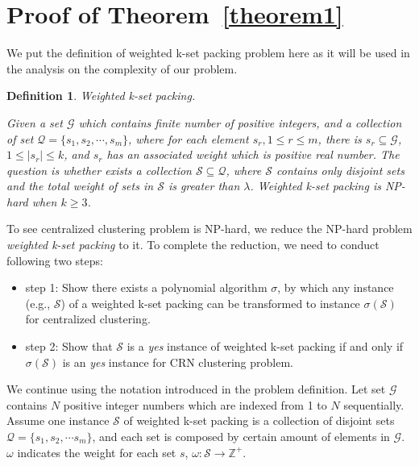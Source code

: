 \documentclass[10pt,journal,compsoc]{IEEEtran}
\makeatletter
\theoremstyle{mytheoremstyle}
\theoremstyle{mytheoremstyle}
\theoremstyle{mytheoremstyle}
\newtheorem{mydef}{Definition}%
\renewenvironment{proof}[1][\proofname]{%
      \par\pushQED{\qed}\fontfamily{ptm}\selectfont%
      \topsep6\p@\@plus6\p@\relax
      \trivlist\item[\hskip\labelsep\bfseries#1\@addpunct{.}]%
      \ignorespaces
    }{%
      \popQED\endtrivlist\@endpefalse
    }
\newcommand{\eg}{e.g., }
\makeatother
\begin{document}
\section*{Proof of Theorem~\ref{theorem1}}
\label{proof_theorem1}
\begin{proof}
We put the definition of weighted k-set packing problem here as it will be used in the analysis on the complexity of our problem.

\begin{mydef}
\label{def_kset_packing}
\textit{Weighted k-set packing.} 

Given a set $\mathcal{G}$ which contains finite number of positive integers, and a collection of set $\mathcal{Q}=\{s_1,s_2,\cdots,s_m\}$, where for each element $s_r, 1\leq r \leq m$, there is $s_r\subseteq \mathcal{G}$, $ 1\leq|s_r| \leq k$, and $s_r$ has an associated weight which is positive real number.
The question is whether exists a collection $\mathcal{S}\subseteq \mathcal{Q}$, where $\mathcal{S}$ contains only disjoint sets and the total weight of sets in $\mathcal{S}$ is greater than $\lambda$.
Weighted k-set packing is NP-hard when $k\geqslant 3$.~\cite{Computers_a_Intractability}
\end{mydef}


To see centralized clustering problem is NP-hard, we reduce the NP-hard problem \textit{weighted k-set packing} to it.
To complete the reduction, we need to conduct following two steps:
\begin{itemize}
\item step 1: Show there exists a polynomial algorithm $\sigma$, by which any instance (\eg $\mathcal{S}$) of a weighted k-set packing can be transformed to instance $\sigma(\mathcal{S})$ for centralized clustering.
\item step 2: Show that $\mathcal{S}$ is a \textit{yes} instance of weighted k-set packing if and only if $\sigma(\mathcal{S})$ is an \textit{yes} instance for CRN clustering problem.
\end{itemize}

We continue using the notation introduced in the problem definition.
Let set $\mathcal{G}$ contains $N$ positive integer numbers which are indexed from 1 to $N$ sequentially.
Assume one instance $\mathcal{S}$ of weighted k-set packing is a collection of disjoint sets $\mathcal{Q} = \{s_1, s_2,\cdots s_m\}$, and each set is composed by certain amount of elements in $\mathcal{G}$.
$\omega$ indicates the weight for each set $s$, $\omega:\mathcal{S}\rightarrow \mathbb{Z}^{+}$.




\end{proof}
\end{document}
